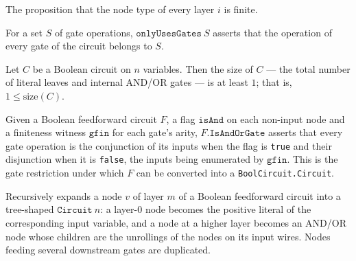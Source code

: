 \begin{definition}
\label{BoolCircuit.FeedForward.Finite}
\leanok
The proposition that the node type of every layer $i$ is finite.
\end{definition}

\begin{definition}
\label{BoolCircuit.FeedForward.onlyUsesGates}
\leanok
For a set $S$ of gate operations, $\texttt{onlyUsesGates}\ S$ asserts that the
operation of every gate of the circuit belongs to $S$.
\end{definition}

\begin{theorem}
\label{BoolCircuit.Circuit.one_le_size}
\leanok
{}
Let $C$ be a Boolean circuit on $n$ variables. Then the size of $C$ — the total number
of literal leaves and internal AND/OR gates — is at least $1$; that is, $1 \le
\mathrm{size}(C)$.
\end{theorem}

\begin{definition}
\label{BoolCircuit.FeedForward.IsAndOrGate}
\leanok
{}
Given a Boolean feedforward circuit $F$, a flag $\texttt{isAnd}$ on each non-input
node and a finiteness witness $\texttt{gfin}$ for each gate's arity,
$F.\texttt{IsAndOrGate}$ asserts that every gate operation is the conjunction of its
inputs when the flag is \texttt{true} and their disjunction when it is \texttt{false},
the inputs being enumerated by $\texttt{gfin}$. This is the gate restriction under
which $F$ can be converted into a \texttt{BoolCircuit.Circuit}.
\end{definition}

\begin{definition}
\label{BoolCircuit.nodeToCircuit}
\leanok
{}
Recursively expands a node $v$ of layer $m$ of a Boolean feedforward circuit into a
tree-shaped $\texttt{Circuit}\ n$: a layer-$0$ node becomes the positive literal of the
corresponding input variable, and a node at a higher layer becomes an AND/OR node
whose children are the unrollings of the nodes on its input wires. Nodes feeding
several downstream gates are duplicated.
\end{definition}

